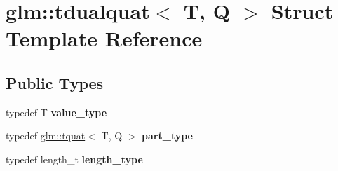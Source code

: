 \hypertarget{structglm_1_1tdualquat}{}\section{glm\+:\+:tdualquat$<$ T, Q $>$ Struct Template Reference}
\label{structglm_1_1tdualquat}
\subsection*{Public Types}
\begin{DoxyCompactItemize}
\item 
\mbox{\label{structglm_1_1tdualquat_ab9028885c8de069ef8a61ebab77f7ccc}} 
typedef T {\bfseries value\+\_\+type}
\item 
\mbox{\label{structglm_1_1tdualquat_ab18b8665bbd568f9bc93ef93ed475a47}} 
typedef \hyperlink{structglm_1_1tquat}{glm\+::tquat}$<$ T, Q $>$ {\bfseries part\+\_\+type}
\item 
\mbox{\label{structglm_1_1tdualquat_ad9fa4fd7f84d17bebd3efed6b5455d80}} 
typedef length\+\_\+t {\bfseries length\+\_\+type}
\end{DoxyCompactItemize}
